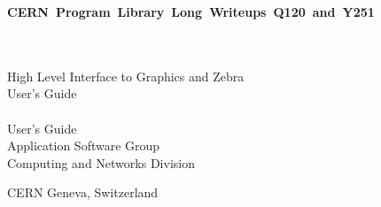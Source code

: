  
 
\begin{titlepage}
\notHTML{\vspace*{-23mm}}%
%
%
\hfill
{}\hbox{\Large\bf CERN Program Library Long Writeups Q120 and Y251}
\hfill\mbox{}
\begin{center}
\mbox{}\\[10mm]
\mbox{}\\[0.5cm]
{\LARGE High Level Interface to Graphics and Zebra}\\[6mm]
{\LARGE User's Guide}\\[15mm]
\mbox{}\\[0.5cm]
{\LARGE User's Guide}\\[25mm]
{\Large Application Software Group}\\[0.5cm]
{\Large Computing and Networks Division}\\[0.5cm]
\end{center}
\notHTML{\vfill}%
\begin{center}\Large CERN Geneva, Switzerland\end{center}
\end{titlepage}


